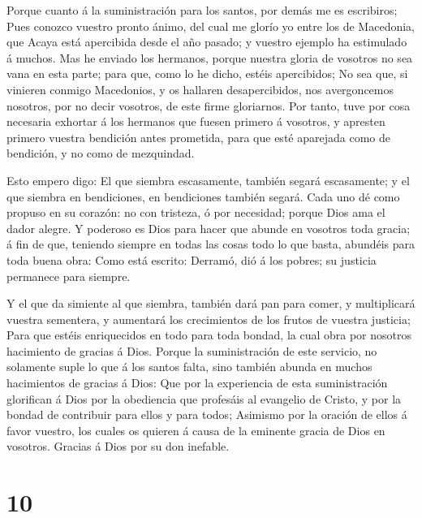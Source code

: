  Porque cuanto á la suministración para los santos, por
demás me es escribiros;  Pues conozco vuestro pronto ánimo,
del cual me glorío yo entre los de Macedonia, que Acaya está apercibida
desde el año pasado; y vuestro ejemplo ha estimulado á muchos.
 Mas he enviado los hermanos, porque nuestra gloria de
vosotros no sea vana en esta parte; para que, como lo he dicho, estéis
apercibidos;  No sea que, si vinieren conmigo Macedonios, y
os hallaren desapercibidos, nos avergoncemos nosotros, por no decir
vosotros, de este firme gloriarnos.  Por tanto, tuve por
cosa necesaria exhortar á los hermanos que fuesen primero á vosotros, y
apresten primero vuestra bendición antes prometida, para que esté
aparejada como de bendición, y no como de mezquindad.

 Esto empero digo: El que siembra escasamente, también
segará escasamente; y el que siembra en bendiciones, en bendiciones
también segará.  Cada uno dé como propuso en su corazón: no
con tristeza, ó por necesidad; porque Dios ama el dador alegre.
 Y poderoso es Dios para hacer que abunde en vosotros toda
gracia; á fin de que, teniendo siempre en todas las cosas todo lo que
basta, abundéis para toda buena obra:  Como está escrito:
Derramó, dió á los pobres; su justicia permanece para siempre.

 Y el que da simiente al que siembra, también dará pan para
comer, y multiplicará vuestra sementera, y aumentará los crecimientos de
los frutos de vuestra justicia;  Para que estéis
enriquecidos en todo para toda bondad, la cual obra por nosotros
hacimiento de gracias á Dios.  Porque la suministración de
este servicio, no solamente suple lo que á los santos falta, sino
también abunda en muchos hacimientos de gracias á Dios: 
Que por la experiencia de esta suministración glorifican á Dios por la
obediencia que profesáis al evangelio de Cristo, y por la bondad de
contribuir para ellos y para todos;  Asimismo por la
oración de ellos á favor vuestro, los cuales os quieren á causa de la
eminente gracia de Dios en vosotros.  Gracias á Dios por su
don inefable.

\hypertarget{section-9}{%
\section{10}\label{section-9}}

